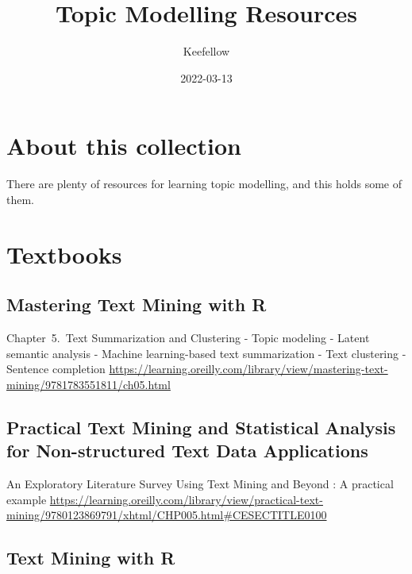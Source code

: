 \documentclass[
]{book}
\title{Topic Modelling Resources}
\author{Keefellow}
\date{2022-03-13}
\begin{document}
\maketitle

{
\setcounter{tocdepth}{1}
\tableofcontents
}
\hypertarget{about-this-collection}{%
\chapter{About this collection}\label{about-this-collection}}

There are plenty of resources for learning topic modelling, and this holds some of them.

\hypertarget{textbooks}{%
\chapter{Textbooks}\label{textbooks}}

\hypertarget{mastering-text-mining-with-r}{%
\section{Mastering Text Mining with R}\label{mastering-text-mining-with-r}}

Chapter~5.~Text Summarization and Clustering
- Topic modeling
- Latent semantic analysis
- Machine learning-based text summarization
- Text clustering
- Sentence completion
\url{https://learning.oreilly.com/library/view/mastering-text-mining/9781783551811/ch05.html}

\hypertarget{practical-text-mining-and-statistical-analysis-for-non-structured-text-data-applications}{%
\section{Practical Text Mining and Statistical Analysis for Non-structured Text Data Applications}\label{practical-text-mining-and-statistical-analysis-for-non-structured-text-data-applications}}

An Exploratory Literature Survey Using Text Mining and Beyond : A practical example
\url{https://learning.oreilly.com/library/view/practical-text-mining/9780123869791/xhtml/CHP005.html\#CESECTITLE0100}

\hypertarget{text-mining-with-r}{%
\section{Text Mining with R}\label{text-mining-with-r}}
\end{document}
